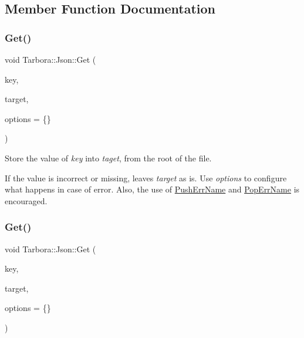 \subsection{Member Function Documentation}
\mbox{\label{classTarbora_1_1Json_a6767cba370c056964e4701ee7d5bab0b}} 
\subsubsection{\texorpdfstring{Get()}{Get()}\hspace{0.1cm}{\footnotesize\ttfamily [1/18]}}
{\footnotesize\ttfamily void Tarbora\+::\+Json\+::\+Get (\begin{DoxyParamCaption}\item[{const char $\ast$}]{key,  }\item[{raw\+\_\+json $\ast$}]{target,  }\item[{\hyperlink{structTarbora_1_1JsonOptions}{Json\+Options}}]{options = {\ttfamily \{\}} }\end{DoxyParamCaption})}



Store the value of {\itshape key} into {\itshape taget}, from the root of the file. 

If the value is incorrect or missing, leaves {\itshape target} as is. Use {\itshape options} to configure what happens in case of error. Also, the use of \hyperlink{classTarbora_1_1Json_a061eac4f16dac3b9b3a26a66de0ea8f0}{Push\+Err\+Name} and \hyperlink{classTarbora_1_1Json_a14019f06d3bd76edd6a6e78134519d11}{Pop\+Err\+Name} is encouraged. \mbox{\label{classTarbora_1_1Json_ad3ff74537c4cb9c9747006a4d04079b4}} 
\subsubsection{\texorpdfstring{Get()}{Get()}\hspace{0.1cm}{\footnotesize\ttfamily [2/18]}}
{\footnotesize\ttfamily void Tarbora\+::\+Json\+::\+Get (\begin{DoxyParamCaption}\item[{const char $\ast$}]{key,  }\item[{bool $\ast$}]{target,  }\item[{\hyperlink{structTarbora_1_1JsonOptions}{Json\+Options}}]{options = {\ttfamily \{\}} }\end{DoxyParamCaption})}


